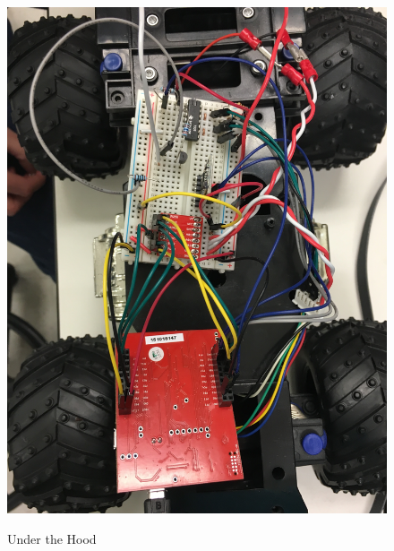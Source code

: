\documentclass[12pt]{article}
\begin{document}
\begin{figure}[H]
\begin {center}
\includegraphics[scale=.10]{car-guts}\\
\caption{Under the Hood}
\end {center}
\end{figure}
\end{document}
